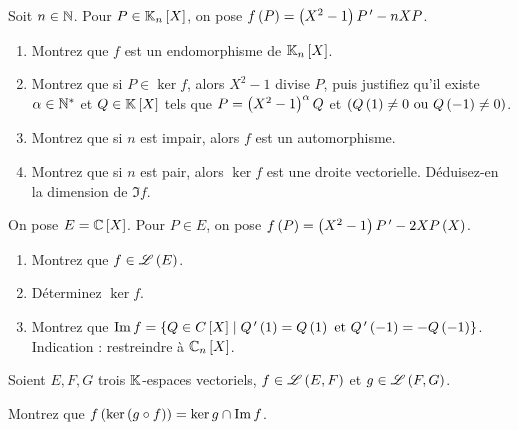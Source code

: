 \begin{exopss}[Exercice 7]
Soit \(n\in\mathbb{N}\). Pour \(P\in\polydeg{n}\), on pose \(f\left(P\right)=\left(X^2-1\right)P^{\,\prime}-nXP\).

\begin{enumerate}
    \item Montrez que \(f\) est un endomorphisme de \(\polydeg{n}\). \\
    \item Montrez que si \(P\in\ker f\), alors \(X^2-1\) divise \(P\), puis justifiez qu'il existe \(\alpha\in\mathbb{N}^*\) et \(Q\in\poly\) tels que \(P=\left(X^2-1\right)^\alpha Q\) et \(\left(Q\left(1\right)\not=0\text{ ou }Q\left(-1\right)\not=0\right)\). \\
    \item Montrez que si \(n\) est impair, alors \(f\) est un automorphisme. \\
    \item Montrez que si \(n\) est pair, alors \(\ker f\) est une droite vectorielle. Déduisez-en la dimension de \(\Im f\).
\end{enumerate}
\end{exopss}

\begin{corr}
\end{corr}

\begin{exoss}[Exercice 8]
On pose \(E=\poly[\C]\). Pour \(P\in E\), on pose \(f\left(P\right)=\left(X^2-1\right)P^{\,\prime}-2XP\left(X\right)\).

\begin{enumerate}
    \item Montrez que \(f\in\mathscr{L}\left(E\right)\). \\
    \item Déterminez \(\ker f\). \\
    \item Montrez que \(\Im f=\accol{Q\in\poly[C]\tq Q\prim\paren{1}=Q\paren{1}\text{ et }Q\prim\paren{-1}=-Q\paren{-1}}\). Indication : restreindre à \(\polydeg[\C]{n}\).
\end{enumerate}
\end{exoss}

\begin{corr}
\end{corr}

\begin{exos}[Exercice 9]
Soient \(E,F,G\) trois \(\mathbb{K}\)-espaces vectoriels, \(f\in\mathscr{L}\left(E,F\right)\) et \(g\in\mathscr{L}\left(F,G\right)\).

Montrez que \(f\left(\ker\left(g\circ f\right)\right)=\ker g\cap\operatorname{Im} f\).
\end{exos}

